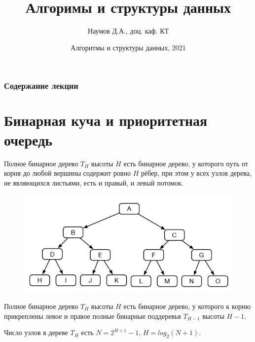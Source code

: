 \documentclass{beamer}
\title[Алгоритмы]{Алгоримы и структуры данных}
\author{Наумов Д.А., доц. каф. КТ}
\date[12.04.2021] {Алгоритмы и структуры данных, 2021}
\begin{document}
\begin{frame}
  \titlepage
\end{frame}
  
\begin{frame}
  \frametitle{Содержание лекции}
  \tableofcontents  
\end{frame}

\section{Бинарная куча и приоритетная очередь}
  
\begin{frame}[t]
	\begin{block}{Полное бинарное дерево}
		$T_H$ высоты $H$ есть бинарное дерево, у которого путь от корня до любой вершины содержит ровно $H$ рёбер, при этом у всех узлов дерева, не являющихся листьями, есть и правый, и левый потомок. 
	\end{block}	
	\begin{figure}[h]
		\centering
		\includegraphics[scale=0.35]{images/lec06-pic01.png}
	\end{figure}
	\begin{block}{Полное бинарное дерево}
		$T_H$ высоты $H$ есть бинарное дерево, у которого к корню прикреплены левое и правое полные бинарные поддеревья $T_{H-1}$ высоты $H-1$. 
	\end{block}
	Число узлов в дереве $T_H$ есть $N = 2^{H+1}-1$, $H=log_2(N+1)$.
\end{frame}
  
\end{document}
